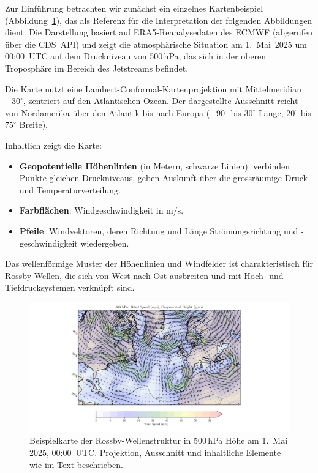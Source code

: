 Zur Einführung betrachten wir zunächst ein einzelnes Kartenbeispiel 
(Abbildung~\ref{fig:rossby_atlantic_single}), das als Referenz für die Interpretation der 
folgenden Abbildungen dient. 
Die Darstellung basiert auf ERA5-Reanalysedaten des ECMWF (abgerufen über die CDS~API) 
und zeigt die atmosphärische Situation am 1.\ Mai~2025 um 00:00~UTC auf dem Druckniveau 
von 500\,hPa, das sich in der oberen Troposphäre im Bereich des Jetstreams befindet.


Die Karte nutzt eine Lambert-Conformal-Kartenprojektion mit Mittelmeridian \(-30^\circ\), zentriert auf den Atlantischen Ozean.
Der dargestellte Ausschnitt reicht von Nordamerika über den Atlantik bis nach Europa (\(-90^\circ\) bis \(30^\circ\) Länge, \(20^\circ\) bis \(75^\circ\) Breite).

Inhaltlich zeigt die Karte:
\begin{itemize}
	\item \textbf{Geopotentielle Höhenlinien} (in Metern, schwarze Linien): verbinden Punkte gleichen Druckniveaus, geben Auskunft über die grossräumige Druck- und Temperaturverteilung.
	\item \textbf{Farbflächen}: Windgeschwindigkeit in m/s.
	\item \textbf{Pfeile}: Windvektoren, deren Richtung und Länge Strömungsrichtung und -geschwindigkeit wiedergeben.
\end{itemize}

Das wellenförmige Muster der Höhenlinien und Windfelder ist charakteristisch für Rossby-Wellen, die sich von West nach Ost ausbreiten und mit Hoch- und Tiefdrucksystemen verknüpft sind.

\begin{figure}
	\centering
	\includegraphics[width=\textwidth, trim=4cm 0cm 5cm 0cm, clip]{papers/rossby/images/weather/data_2025_5_1_00-00_500.pdf}
	\caption{Beispielkarte der Rossby-Wellenstruktur in 500\,hPa Höhe am 1.\ Mai 2025, 00:00~UTC.
		Projektion, Ausschnitt und inhaltliche Elemente wie im Text beschrieben.}
	\label{fig:rossby_atlantic_single}
\end{figure}

